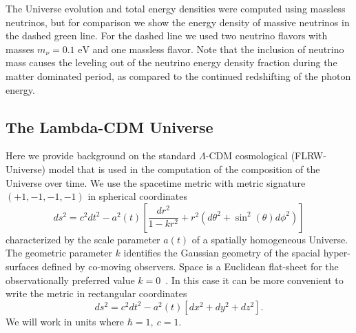 \documentclass[universe,article,submit,moreauthors,pdftex,a4paper]{Definitions/mdpi}
\newcommand{\eV}{\text{ eV}}
\newcommand{\beqn}{\begin{equation}}
\newcommand{\eeqn}{\end{equation}}
\begin{document}
The Universe evolution and total energy densities were computed using massless neutrinos, but for comparison we show the energy density of massive neutrinos in the dashed green line. For the dashed line we used two neutrino flavors with masses $m_\nu=0.1\eV$ and one massless flavor. Note that the inclusion of neutrino mass causes the leveling out of the neutrino energy density fraction during the matter dominated period, as compared to the continued redshifting of the photon energy.

\subsection{The Lambda-CDM Universe}\label{sec:Cosmo}
\noindent Here we provide background on the standard $\Lambda$-CDM cosmological (FLRW-Universe) model that is used in the computation of the composition of the Universe over time. We use the spacetime metric with metric signature $(+1,-1,-1,-1)$ in spherical coordinates
\beqn\label{metric}
ds^2=c^2dt^2-a^2(t)\left[ \frac{dr^2}{1-kr^2}+r^2(d\theta^2+\sin^2(\theta)d\phi^2)\right]
\eeqn
characterized by the scale parameter $a(t)$ of a spatially homogeneous Universe. The geometric parameter $k$ identifies the Gaussian geometry of the spacial hyper-surfaces defined by co-moving observers. Space is a Euclidean flat-sheet for the observationally preferred value $k=0$~\cite{Planck:2013pxb,Planck:2015fie,Planck:2018vyg}. In this case it can be more convenient to write the metric in rectangular coordinates
\beqn\label{metric2}
ds^2=c^2dt^2-a^2(t)\left[ dx^2+dy^2+dz^2\right].
\eeqn
We will work in units where $\hbar=1,\ c=1$.
\end{document}
